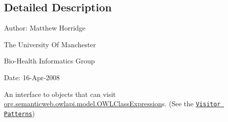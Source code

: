 \subsection{Detailed Description}
Author\-: Matthew Horridge\par
 The University Of Manchester\par
 Bio-\/\-Health Informatics Group\par
 Date\-: 16-\/\-Apr-\/2008\par
\par
 

An interface to objects that can visit \hyperlink{interfaceorg_1_1semanticweb_1_1owlapi_1_1model_1_1_o_w_l_class_expression}{org.\-semanticweb.\-owlapi.\-model.\-O\-W\-L\-Class\-Expression}s. (See the \href{http://en.wikipedia.org/wiki/Visitor_pattern}{\tt Visitor Patterns}) 

